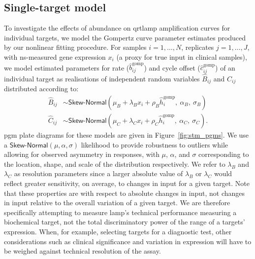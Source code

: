 \documentclass[../thesis.tex]{subfiles}
\begin{document}
\subsection{Single-target model \label{sec:singletargetmodel}}
To investigate the effects of  abundance on \gls{qrtlamp} amplification curves for individual targets, we model the Gompertz curve parameter estimates produced by our nonlinear fitting procedure. For samples $i = 1, \dots, N$, replicates $j = 1, \dots, J$, with \gls{ns}-measured gene expression $x_i$ (a proxy for true  input in clinical samples), we model estimated parameters for rate ($\hat{b}_{ij}^{\text{gomp}}$) and cycle offset ($\hat{c}_{ij}^{\text{gomp}}$) of an individual target as realisations of independent random variables $\hat{B}_{ij}$ and $\hat{C}_{ij}$ distributed according to:
\begin{align} 
    \hat{B}_{ij} & \sim \textsf{Skew-Normal}(\mu_B + \lambda_B x_i + \rho_B \hat{h}^{\text{gomp}}_i, \ \alpha_B, \ \sigma_B ) \label{eq:bsm}\\
    \hat{C}_{ij} & \sim \textsf{Skew-Normal}(\mu_C + \lambda_C x_i + \rho_C \hat{h}^{\text{gomp}}_i, \ \alpha_C, \ \sigma_C). \label{eq:csm}
\end{align}
\Gls{pgm} plate diagrams for these models are given in Figure~\ref{fig:stm_pgms}. We use a $\textsf{Skew-Normal}(\mu,\alpha,\sigma)$ likelihood to provide robustness to outliers while allowing for observed asymmetry in responses, with $\mu$, $\alpha$, and $\sigma$ corresponding to the location, shape, and scale of the distribution respectively. We refer to $\lambda_B$ and $\lambda_C$ as resolution parameters since a larger absolute value of $\lambda_B$ or $\lambda_C$ would reflect greater sensitivity, on average, to changes in  input for a given target.
Note that these properties are with respect to absolute changes in  input, not changes in  input relative to the overall variation of a given target. We are therefore specifically attempting to measure \gls{lamp}'s technical performance measuring a biochemical target, not the total discriminatory power of the range of a targets' expression. When, for example, selecting targets for a diagnostic test, other considerations such as clinical significance and variation in expression will have to be weighed against technical resolution of the assay.
\end{document}
